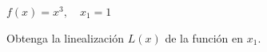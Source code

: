 \setcounter{enumi}{32}
\item $f(x) = x^3, \quad x_1 = 1$
\par
Obtenga la linealización $L(x)$ de la función en $x_1$.
